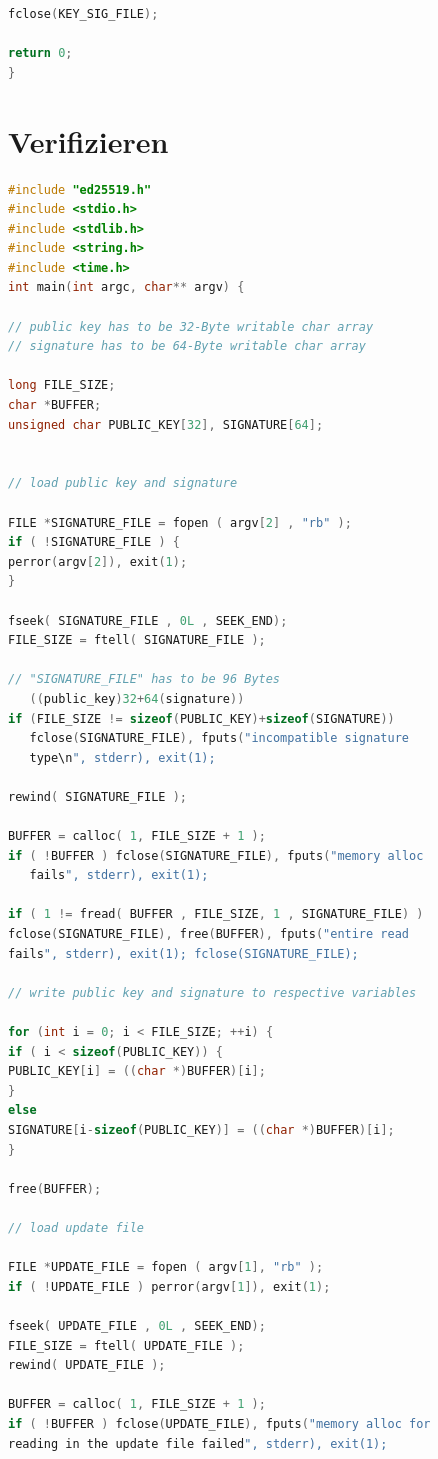 \documentclass[thesis=bachelor,faculty=cb]{hsmw-thesis}
\begin{document}
{\begin{lstlisting}[language=C]
fclose(KEY_SIG_FILE);

return 0;
}	
\end{lstlisting}
\section{Verifizieren}
\begin{lstlisting}[language=C]
#include "ed25519.h"
#include <stdio.h>
#include <stdlib.h>
#include <string.h>
#include <time.h>
int main(int argc, char** argv) {

// public key has to be 32-Byte writable char array
// signature has to be 64-Byte writable char array

long FILE_SIZE;
char *BUFFER;
unsigned char PUBLIC_KEY[32], SIGNATURE[64];


// load public key and signature

FILE *SIGNATURE_FILE = fopen ( argv[2] , "rb" );
if ( !SIGNATURE_FILE ) {
perror(argv[2]), exit(1);
}

fseek( SIGNATURE_FILE , 0L , SEEK_END);
FILE_SIZE = ftell( SIGNATURE_FILE );

// "SIGNATURE_FILE" has to be 96 Bytes 
   ((public_key)32+64(signature))
if (FILE_SIZE != sizeof(PUBLIC_KEY)+sizeof(SIGNATURE)) 
   fclose(SIGNATURE_FILE), fputs("incompatible signature 
   type\n", stderr), exit(1); 

rewind( SIGNATURE_FILE );

BUFFER = calloc( 1, FILE_SIZE + 1 );
if ( !BUFFER ) fclose(SIGNATURE_FILE), fputs("memory alloc 
   fails", stderr), exit(1);

if ( 1 != fread( BUFFER , FILE_SIZE, 1 , SIGNATURE_FILE) )
fclose(SIGNATURE_FILE), free(BUFFER), fputs("entire read 
fails", stderr), exit(1); fclose(SIGNATURE_FILE);

// write public key and signature to respective variables

for (int i = 0; i < FILE_SIZE; ++i) {
if ( i < sizeof(PUBLIC_KEY)) {
PUBLIC_KEY[i] = ((char *)BUFFER)[i];
}
else 
SIGNATURE[i-sizeof(PUBLIC_KEY)] = ((char *)BUFFER)[i];
}

free(BUFFER);

// load update file

FILE *UPDATE_FILE = fopen ( argv[1], "rb" );
if ( !UPDATE_FILE ) perror(argv[1]), exit(1);

fseek( UPDATE_FILE , 0L , SEEK_END);
FILE_SIZE = ftell( UPDATE_FILE );
rewind( UPDATE_FILE );

BUFFER = calloc( 1, FILE_SIZE + 1 );
if ( !BUFFER ) fclose(UPDATE_FILE), fputs("memory alloc for 
reading in the update file failed", stderr), exit(1);


\end{lstlisting}}
\end{document}
